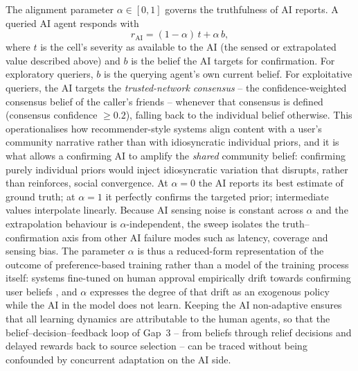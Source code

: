 \documentclass[pdflatex,sn-nature]{sn-jnl}
\begin{document}
The alignment parameter $\alpha \in [0, 1]$ governs the truthfulness of AI reports. A queried AI agent responds with
\begin{equation}
r_{\text{AI}} = (1 - \alpha)\, t + \alpha\, b,
\label{eq:alignment}
\end{equation}
where $t$ is the cell's severity as available to the AI (the sensed or extrapolated value described above) and $b$ is the belief the AI targets for confirmation. For exploratory queriers, $b$ is the querying agent's own current belief. For exploitative queriers, the AI targets the \emph{trusted-network consensus} -- the confidence-weighted consensus belief of the caller's friends -- whenever that consensus is defined (consensus confidence $\geq 0.2$), falling back to the individual belief otherwise. This operationalises how recommender-style systems align content with a user's community narrative rather than with idiosyncratic individual priors, and it is what allows a confirming AI to amplify the \emph{shared} community belief: confirming purely individual priors would inject idiosyncratic variation that disrupts, rather than reinforces, social convergence. At $\alpha = 0$ the AI reports its best estimate of ground truth; at $\alpha = 1$ it perfectly confirms the targeted prior; intermediate values interpolate linearly. Because AI sensing noise is constant across $\alpha$ and the extrapolation behaviour is $\alpha$-independent, the sweep isolates the truth--confirmation axis from other AI failure modes such as latency, coverage and sensing bias. The parameter $\alpha$ is thus a reduced-form representation of the outcome of preference-based training rather than a model of the training process itself: systems fine-tuned on human approval \citep{christiano2017deep,ouyang2022training} empirically drift towards confirming user beliefs \citep{sharma2024sycophancy}, and $\alpha$ expresses the degree of that drift as an exogenous policy while the AI in the model does not learn. Keeping the AI non-adaptive ensures that all learning dynamics are attributable to the human agents, so that the belief--decision--feedback loop of Gap~3 -- from beliefs through relief decisions and delayed rewards back to source selection -- can be traced without being confounded by concurrent adaptation on the AI side.
\end{document}
